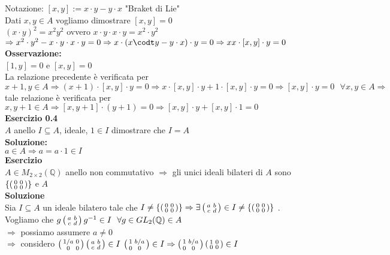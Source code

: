\documentclass[12px]{article}
\begin{document}
	  Notazione: $[x,y] := x\cdot y - y\cdot x$ "Braket di Lie"\\
	  Dati  $x,y\in A$ vogliamo dimostrare $[x,y] = 0$\\
	   $(x\cdot y)^2= x^2y^2$ ovvero $x\cdot y \cdot x\cdot y = x^2 \cdot y^2$\\
	    $ \Rightarrow x^2\cdot y^2 - x\cdot y \cdot x \cdot y = 0 \Rightarrow x\cdot(x\codt y - y\cdot x)\cdot y = 0\\
	    \Rightarrow x
	    x\cdot [x,y]\cdot y = 0$ \\
	    \textbf{Osservazione:}\\
	    $[1,y] = 0$ e $[x,y] = 0$\\
	    La relazione precedente è verificata per  $x + 1, y\in A \Rightarrow (x+1)\cdot [x,y]\cdot y = 0 \Rightarrow  x\cdot [x,y]\cdot y + 1\cdot[x,y]\cdot y = 0 \Rightarrow [x,y]\cdot y = 0\ \ \ \forall x,y\in A \Rightarrow $ tale relazione è verificata per $x,y + 1\in A \Rightarrow [x, y + 1] \cdot (y + 1) = 0 \Rightarrow [x,y]\cdot y + [x,y] \cdot 1  =0 $\\
	    \textbf{Esercizio 0.4}\\
	    $A$ anello $I\subseteq A$, ideale, $1\in I$ dimostrare che  $I=A$\\
	     \textbf{Soluzione:}\\
	     $a\in A \Rightarrow a = a\cdot 1\in I$ \\
	     \textbf{Esercizio}\\
	     $A\in M_{2\times 2}(\mathbb Q)$ anello non commutativo $ \Rightarrow$ gli unici ideali bilateri di $A$ sono $\{\left(\begin{smallmatrix}0&0\\0&0\end{smallmatrix}\right)\}$ e $A$\\
	      \textbf{Soluzione}\\
	     Sia $I\subseteq A$ un ideale bilatero tale che  $I\neq \{\left(\begin{smallmatrix}0&0\\0&0\end{smallmatrix}\right)\} \Rightarrow \exists \left(\begin{smallmatrix}a&b\\c&d\end{smallmatrix}\right)\in I \neq \{\left(\begin{smallmatrix}0&0\\0&0\end{smallmatrix}\right)\}$ .\\
	     Vogliamo che $g\left(\begin{smallmatrix}a&b\\c&d\end{smallmatrix}\right)g^{-1}\in I \ \ \forall g\in GL_2(\mathbb Q)\in A$\\
	      $  \Rightarrow $ possiamo assumere $a\neq 0$\\
	     $ \Rightarrow $ considero $\left(\begin{smallmatrix}1/a & 0 \\0 & 0\end{smallmatrix}\right)\left(\begin{smallmatrix}a&b\\c&d\end{smallmatrix}\right)\in I$  \Rightarrow  $\left(\begin{smallmatrix}1 & b/a\\0&0\end{smallmatrix}\right)\in I \Rightarrow \left(\begin{smallmatrix}1 & b/a\\0&0\end{smallmatrix}\right)\left(\begin{smallmatrix}1&0\\0&0\end{smallmatrix}\right)\in I $ \\
\end{document}
